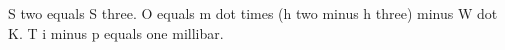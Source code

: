 S two equals S three. O equals m dot times (h two minus h three) minus W dot K. T i minus p equals one millibar.